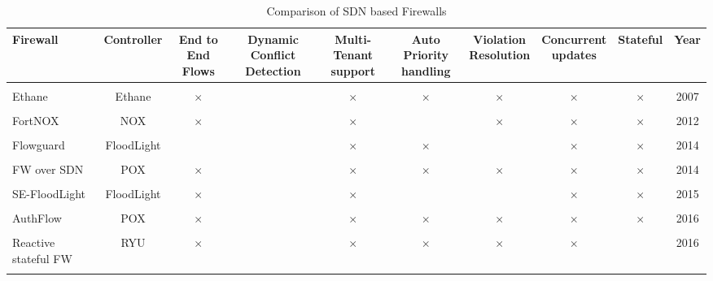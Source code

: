 \begin{table}
	\caption{Comparison of SDN based Firewalls}
	\label{tab:commands}
	\begin{tabular}{lccccccccc}
		\toprule
		Firewall&Controller&\thead{End to End \\ Flows}& \thead{Dynamic Conflict \\ Detection} &\thead{Multi-Tenant\\ support}& \thead{Auto Priority \\ handling}&\thead {Violation\\ Resolution}&\thead{Concurrent \\updates}&Stateful&Year
		\\
		\midrule
		\\
		Ethane\footnotemark{} \cite{ETHANE}& Ethane& $\times$& \checkmark& $\times$& $\times$& $\times$ & $\times$& $\times$ &2007\\\\
		FortNOX \cite{FORTNOX}& NOX& $\times$& \checkmark& $\times$& \checkmark& $\times$ & $\times$& $\times$ &2012\\\\
		Flowguard \cite{FLOWGUARD}& FloodLight& \checkmark& \checkmark& $\times$& $\times$& \checkmark & $\times$& $\times$ &2014 \\\\
		FW over SDN \cite{FWSDN}& POX& $\times$& \checkmark& $\times$& $\times$& $\times$ & $\times$& $\times$ & 2014 \\ \\
		SE-FloodLight\footnotemark{} \cite{SEFLOOD}& FloodLight& $\times$& \checkmark& $\times$& \checkmark& \checkmark & $\times$& $\times$& 2015 \\\\
		AuthFlow \cite{AUTHFLOW}& POX& $\times$& \checkmark& $\times$& $\times$& $\times$ & $\times$& $\times$ & 2016\\\\
		Reactive stateful FW \cite{REACTIVEFW}& RYU& $\times$& \checkmark& $\times$& $\times$& $\times$ & $\times$& \checkmark & 2016\\\\
		\bottomrule
	\end{tabular}
\end{table}

